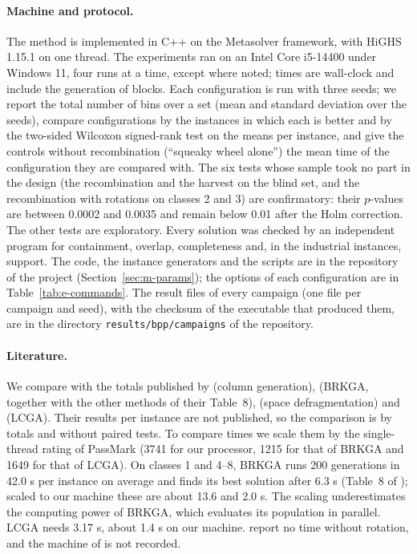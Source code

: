 \paragraph{Machine and protocol.}
The method is implemented in C++ on the Metasolver framework, with HiGHS 1.15.1 \citep{Huangfu2018} on one thread. The
experiments ran on an Intel Core i5-14400 under Windows 11, four runs at a time, except where noted; times are
wall-clock and include the generation of blocks. Each configuration is run with three seeds; we report the total
number of bins over a set (mean and standard deviation over the seeds), compare configurations by the instances in
which each is better and by the two-sided Wilcoxon signed-rank test on the means per instance, and give the controls
without recombination (``squeaky wheel alone'') the mean time of the configuration they are compared with. The six
tests whose sample took no part in the design (the recombination and the harvest on the blind set, and the
recombination with rotations on classes 2 and 3) are confirmatory: their $p$-values are between 0.0002 and 0.0035 and
remain below 0.01 after the Holm correction. The other tests are exploratory. Every solution was checked by an
independent program for containment, overlap, completeness and, in the industrial instances, support. The code, the
instance generators and the scripts are in the repository of the project (Section~\ref{sec:m-params}); the options of
each configuration are in Table~\ref{tab:e-commands}.
The result files of every campaign (one file per campaign and seed), with the checksum of the executable that produced
them, are in the directory \texttt{results/bpp/campaigns} of the repository.

\paragraph{Literature.}
We compare with the totals published by \citet{Mahvash2018} (column generation), \citet{Goncalves2013} (BRKGA, together
with the other methods of their Table~8), \citet{Zhu2012SD} (space defragmentation) and \citet{Elhedhli2019} (LCGA). Their
results per instance are not published, so the comparison is by totals and without paired tests. To compare times we
scale them by the single-thread rating of PassMark \citep{PassMark} (3741 for our processor, 1215 for that of BRKGA and
1649 for that of LCGA). On classes 1 and 4--8, BRKGA runs 200 generations in 42.0 s per instance on average and finds its
best solution after 6.3 s (Table~8 of \citet{Goncalves2013}); scaled to our machine these are about 13.6 and 2.0 s. The
scaling underestimates the computing power of BRKGA, which evaluates its population in parallel. LCGA needs 3.17 s, about
1.4 s on our machine. \citet{Mahvash2018} report no time without rotation, and the machine of \citet{Zhu2012SD} is not
recorded.

